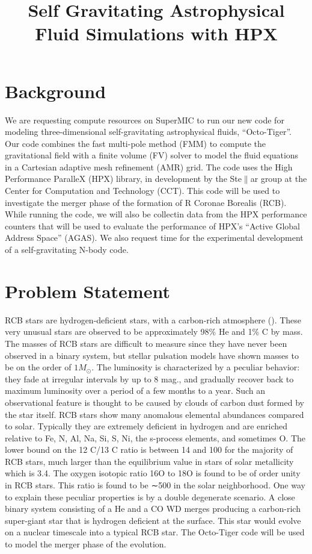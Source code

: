 \documentclass[preprint]{aastex}
\begin{document}
 \title{Self Gravitating Astrophysical Fluid Simulations with HPX}





\section{Background}
\label{section_background}

We are requesting compute resources on SuperMIC to run our new code for modeling three-dimensional self-gravitating astrophysical fluids, ``Octo-Tiger''.  Our code combines the fast multi-pole method 
(FMM) to compute the gravitational field with a finite volume (FV) solver to model the fluid equations in a Cartesian adaptive mesh refinement (AMR) grid. The code uses the High Performance ParalleX (HPX) library,
in development
by the Ste$\parallel$ar group at the Center for Computation and Technology (CCT). This code will be used to investigate the merger phase 
of the formation of R Coronae Borealis (RCB). While running the code, we will also be collectin data from the HPX performance counters that will be used to evaluate the performance of
HPX's ``Active Global Address Space''  (AGAS). We also request time for the experimental development of a self-gravitating N-body code.



\section{Problem Statement}

RCB stars are hydrogen-deficient stars, with a carbon-rich atmosphere (\cite{C2012}).
These very unusual stars are observed to be approximately 98\% He and 1\% C by mass. The masses of RCB stars are difficult to measure since they have never been observed in a binary system, but 
stellar pulsation models have shown masses to be on the order of $1 M_\odot$. The luminosity is characterized by a peculiar behavior: they fade at irregular intervals by up to 8 mag., and 
gradually recover back to maximum luminosity over a period of a few months to a year. Such an observational feature is thought to be caused by clouds of carbon dust formed by the star itself. 
RCB stars show many anomalous elemental abundances compared to solar. Typically they are extremely deficient in hydrogen and are enriched relative to Fe, N, Al, Na, Si, S, Ni, the s-process
 elements, and sometimes O. The lower bound on the 12 C/13 C ratio is between 14 and 100 for the majority of RCB stars, much larger than the equilibrium value in stars of solar metallicity which is 3.4. 
The oxygen isotopic ratio 16O to 18O is found to be of order unity in RCB stars. This ratio is found to be ∼500 in the solar neighborhood. One way to explain these peculiar properties is by a 
double degenerate scenario. A close binary system consisting of a He and a CO WD merges producing a carbon-rich super-giant star that is hydrogen deficient at the surface. This star would 
evolve on a nuclear timescale into a typical RCB star. The Octo-Tiger code will be used to model the merger phase of the evolution. 
\end{document}
